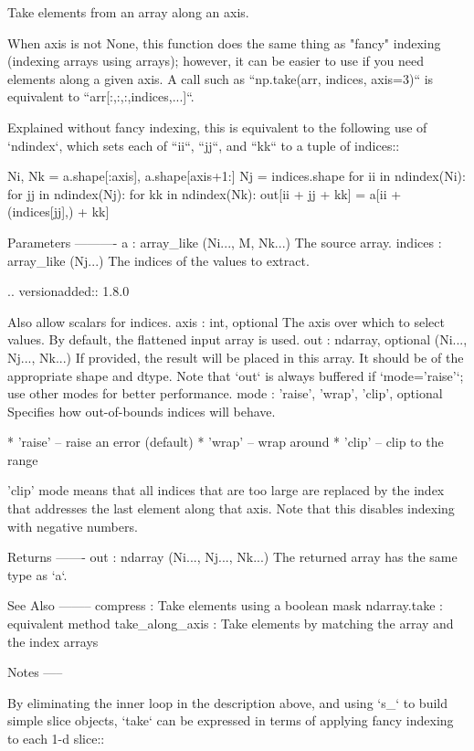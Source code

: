\begin{DoxyVerb}Take elements from an array along an axis.

When axis is not None, this function does the same thing as "fancy"
indexing (indexing arrays using arrays); however, it can be easier to use
if you need elements along a given axis. A call such as
``np.take(arr, indices, axis=3)`` is equivalent to
``arr[:,:,:,indices,...]``.

Explained without fancy indexing, this is equivalent to the following use
of `ndindex`, which sets each of ``ii``, ``jj``, and ``kk`` to a tuple of
indices::

    Ni, Nk = a.shape[:axis], a.shape[axis+1:]
    Nj = indices.shape
    for ii in ndindex(Ni):
        for jj in ndindex(Nj):
            for kk in ndindex(Nk):
                out[ii + jj + kk] = a[ii + (indices[jj],) + kk]

Parameters
----------
a : array_like (Ni..., M, Nk...)
    The source array.
indices : array_like (Nj...)
    The indices of the values to extract.

    .. versionadded:: 1.8.0

    Also allow scalars for indices.
axis : int, optional
    The axis over which to select values. By default, the flattened
    input array is used.
out : ndarray, optional (Ni..., Nj..., Nk...)
    If provided, the result will be placed in this array. It should
    be of the appropriate shape and dtype. Note that `out` is always
    buffered if `mode='raise'`; use other modes for better performance.
mode : {'raise', 'wrap', 'clip'}, optional
    Specifies how out-of-bounds indices will behave.

    * 'raise' -- raise an error (default)
    * 'wrap' -- wrap around
    * 'clip' -- clip to the range

    'clip' mode means that all indices that are too large are replaced
    by the index that addresses the last element along that axis. Note
    that this disables indexing with negative numbers.

Returns
-------
out : ndarray (Ni..., Nj..., Nk...)
    The returned array has the same type as `a`.

See Also
--------
compress : Take elements using a boolean mask
ndarray.take : equivalent method
take_along_axis : Take elements by matching the array and the index arrays

Notes
-----

By eliminating the inner loop in the description above, and using `s_` to
build simple slice objects, `take` can be expressed  in terms of applying
fancy indexing to each 1-d slice::


\end{DoxyVerb}
